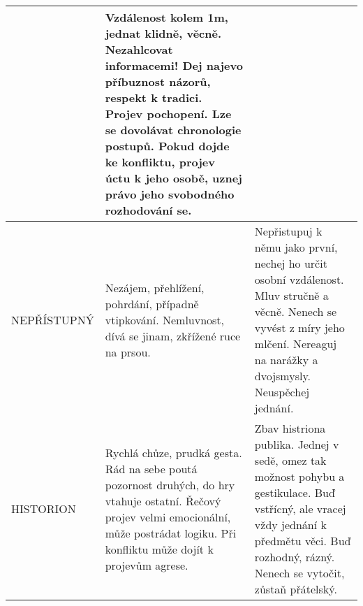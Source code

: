 \documentclass[12pt, a4paper]{article}
\begin{document}
\begin{tabular}{ | p{}| p{} | p{}|}
&
Vzdálenost kolem 1m, jednat klidně, věcně. Nezahlcovat informacemi! Dej najevo příbuznost názorů, respekt k tradici. Projev pochopení. Lze se dovolávat chronologie postupů. Pokud dojde ke konfliktu, projev úctu k jeho osobě, uznej právo jeho svobodného rozhodování se.
\\ \hline
NEPŘÍSTUPNÝ
&
Nezájem, přehlížení, pohrdání, případně vtipkování. Nemluvnost, dívá se jinam, zkřížené ruce na prsou.
&
Nepřistupuj k němu jako první, nechej ho určit osobní vzdálenost. Mluv stručně a věcně. Nenech se vyvést z míry jeho mlčení. Nereaguj na narážky a dvojsmysly. Neuspěchej jednání.
\\ \hline
HISTORION
&
Rychlá chůze, prudká gesta. Rád na sebe poutá pozornost druhých, do hry vtahuje ostatní. Řečový projev velmi emocionální, může postrádat logiku. Při konfliktu může dojít k projevům agrese.
&
Zbav histriona publika. Jednej v sedě, omez tak možnost pohybu a gestikulace. Buď vstřícný, ale vracej vždy jednání k předmětu věci. Buď rozhodný, rázný. Nenech se vytočit, zůstaň přátelský.
\\ \hline
\end{tabular}
\end{document}
